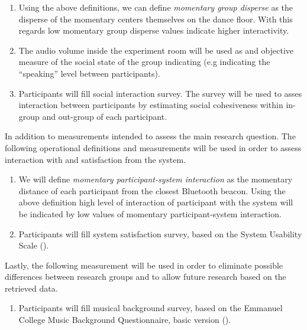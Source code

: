 \documentclass[a4paper,11pt]{article}
\newcommand{\definition}[1]{\emph{#1}}
\begin{document}
{\begin{enumerate}
	\begin{equation*}
		\sum_{i=1}^n \frac{\sqrt{(x_i - \mu_x)^2 + (y_i - \mu_y)^2}}{n}
	\end{equation*}

	where $(x_i, y_i)$ are the positioning of the group members on the dance floor and $(\mu_x, \mu_y)$ is their \definition{momentary center}.
	Using the above definitions interaction between the members of one group with other participants will be evaluated by the disperse of the groups, when high disperse values indicate higher interactivity.
	\item \label{measure:groups} Using the above definitions, we can define \definition{momentary group disperse} as the disperse of the momentary centers themselves on the dance floor.
	With this regards low momentary group disperse values indicate higher interactivity.
	\item \label{measure:audio} The audio volume inside the experiment room will be used as and objective measure of the social state of the group indicating (e.g indicating the ``speaking'' level between participants).
	\item \label{measure:survey:social} Participants will fill social interaction survey.
	The survey will be used to asses interaction between participants by estimating social cohesiveness within in-group and out-group of each participant.
\end{enumerate}
In addition to measurements intended to assess the main research question.
The following operational definitions and measurements will be used in order to assess interaction with and satisfaction from the system.
\begin{enumerate}[resume]
	\item \label{measure:system} We will define \definition{momentary participant-system interaction} as the momentary distance of each participant from the closest Bluetooth beacon.
	Using the above definition high level of interaction of participant with the system will be indicated by low values of momentary participant-system interaction.
	\item \label{measure:survey:usability} Participants will fill system satisfaction survey, based on the System Usability Scale (\cite{brooke96}).
\end{enumerate}
Lastly, the following measurement will be used in order to eliminate possible differences between research groups and to allow future research based on the retrieved data.
\begin{enumerate}[resume]
	\item \label{measure:survey:musical} Participants will fill musical background survey, based on the Emmanuel College Music Background Questionnaire, basic version (\cite{web:zhao12}).
\end{enumerate}

}
\end{document}
